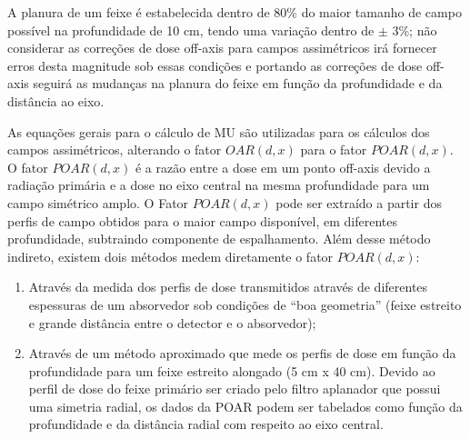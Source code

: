 \documentclass[11pt,a4paper]{article}
\begin{document}
        A planura de um feixe é estabelecida dentro de 80\% do maior tamanho de campo possível na profundidade de 10 cm, tendo uma variação dentro de $\pm$ 3\%; não considerar as correções de dose off-axis para campos assimétricos irá fornecer erros desta magnitude sob essas condições e portando as correções de dose off-axis seguirá as mudanças na planura do feixe em função da profundidade e da distância ao eixo.


        As equações gerais para o cálculo de MU são utilizadas para os cálculos dos campos assimétricos, alterando o fator $OAR(d, x)$ para o fator $POAR(d, x)$. O fator $POAR(d, x)$ é a razão entre a dose em um ponto off-axis devido a radiação primária e a dose no eixo central na mesma profundidade para um campo simétrico amplo. O Fator $POAR(d, x)$ pode ser extraído a partir dos perfis de campo obtidos para o maior campo disponível, em diferentes profundidade, subtraindo componente de espalhamento. Além desse método indireto, existem dois métodos medem diretamente o fator $POAR(d, x)$:

        \begin{enumerate}
            \item Através da medida dos perfis de dose transmitidos através de diferentes espessuras de um absorvedor sob condições de ``boa geometria'' (feixe estreito e grande distância entre o detector e o absorvedor);
            \item Através de um método aproximado que mede os perfis de dose em função da profundidade para um feixe estreito alongado (5 cm x 40 cm). Devido ao perfil de dose do feixe primário ser criado pelo filtro aplanador que possui uma simetria radial, os dados da POAR podem ser tabelados como função da profundidade e da distância radial com respeito ao eixo central.
        \end{enumerate}
    

\end{document}
